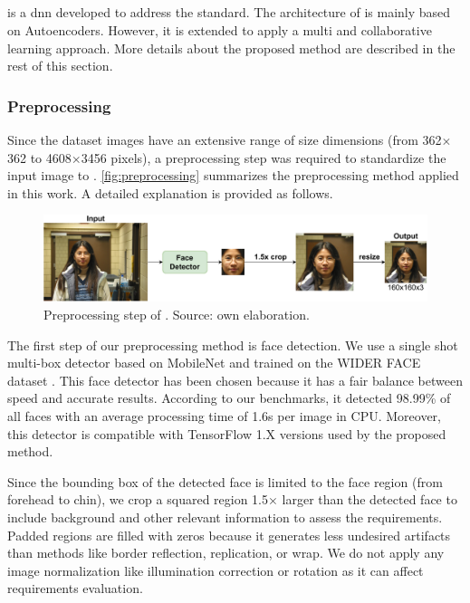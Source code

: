 \subsection{\methodname}

\methodname is a \acl{dnn} developed to address the \icao standard. The architecture of \methodname is mainly based on Autoencoders. However, it is extended to apply a multi and collaborative learning approach. More details about the proposed method are described in the rest of this section. 

\subsubsection{Preprocessing} \label{sec:preprocessing}

Since the \adhoc dataset images have an extensive range of size dimensions (from 362$\times$362 to 4608$\times$3456 pixels), a preprocessing step was required to standardize the input image to \methodname. \autoref{fig:preprocessing} summarizes the preprocessing method applied in this work. A detailed explanation is provided as follows.

\begin{figure}[tb]
\centering
\includegraphics[width=\linewidth]{images/preprocessing.pdf}
\caption{Preprocessing step of \methodname. Source: own elaboration.}
\label{fig:preprocessing}
\end{figure}

The first step of our preprocessing method is face detection. We use a single shot multi-box detector based on MobileNet \citep{yeephycho} and trained on the WIDER FACE dataset \citep{yang2016wider}. This face detector has been chosen because it has a fair balance between speed and accurate results. According to our benchmarks, it detected 98.99\% of all faces with an average processing time of 1.6s per image in CPU. Moreover, this detector is compatible with TensorFlow 1.X versions used by the proposed method. 

Since the bounding box of the detected face is limited to the face region (from forehead to chin), we crop a squared region 1.5$\times$ larger than the detected face to include background and other relevant information to assess the requirements. Padded regions are filled with zeros because it generates less undesired artifacts than methods like border reflection, replication, or wrap. We do not apply any image normalization like illumination correction or rotation as it can affect requirements evaluation. 

